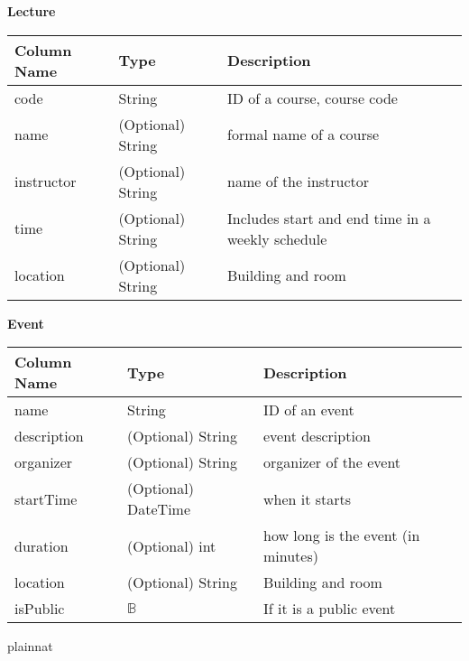 \documentclass[12pt, titlepage]{article}
\begin{document}
\textbf{Lecture}
\begin{table}[H]
	\begin{tabular}{|p{}|p{}|p{}|}
		\hline
		\textbf{Column Name} & \textbf{Type}  & \textbf{Description}                  \\
		\hline
		code                   & String                & ID of a course, course code\\
		\hline
		name           & (Optional) String     & formal name of a course      \\
		\hline
		instructor           & (Optional) String      & name of the instructor       \\
		\hline
		time            & (Optional) String                & Includes start and end time in a weekly schedule  \\
		\hline
		location             & (Optional) String                & Building and room                 \\
		\hline
\end{tabular}
\end{table}

\textbf{Event}
\begin{table}[H]
	\begin{tabular}{|p{}|p{}|p{}|}
		\hline
		\textbf{Column Name} & \textbf{Type}  & \textbf{Description}                  \\
		\hline
		name                   & String                & ID of an event\\
		\hline
		description           & (Optional) String     & event description \\
		\hline
		organizer           & (Optional) String      & organizer of the event       \\
		\hline
		startTime            & (Optional) DateTime               & when it starts  \\
		\hline
		duration            & (Optional) int               & how long is the event (in minutes)  \\
		\hline
		location             & (Optional) String                & Building and room                 \\
		\hline
		isPublic             & $\mathbb{B}$                & If it is a public event                \\
		\hline
\end{tabular}
\end{table}
\newpage
 {plainnat}

\end{document}

